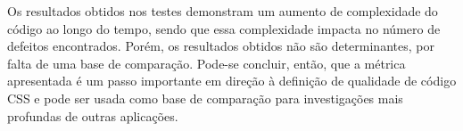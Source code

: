 Os resultados obtidos nos testes demonstram um aumento de complexidade do código ao longo do tempo, sendo que essa complexidade impacta no número de defeitos encontrados. Porém, os resultados obtidos não são determinantes, por falta de uma base de comparação. Pode-se concluir, então, que a métrica apresentada é um passo importante em direção à definição de qualidade de código CSS e pode ser usada como base de comparação para investigações mais profundas de outras aplicações.